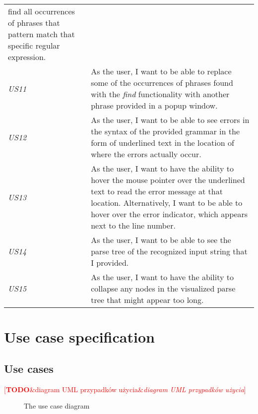 \documentclass[english,engineering]{wizthesis}
\newcommand{\todo}[1]{%
  \textcolor{red}{[\textbf{TODO}\ifx&#1&{}\else{ }\fi\emph{#1}]}%
}
\begin{document}
\begin{xltabular}{\textwidth}{@{}lX@{}}
  find all occurrences of phrases that pattern match that specific regular
  expression.  \\
  \addlinespace[0.5em] \emph{US11} & As the user, I want to be able to replace
  some of the occurrences of phrases found with the \emph{find} functionality
  with another phrase provided in a popup window. \\
  \addlinespace[0.5em] \emph{US12} & As the user, I want to be able to see
  errors in the syntax of the provided grammar in the form of underlined text in
  the location of where the errors actually occur. \\
  \addlinespace[0.5em] \emph{US13} & As the user, I want to have the ability to
  hover the mouse pointer over the underlined text to read the error message at
  that location. Alternatively, I want to be able to hover over the error
  indicator, which appears next to the line number. \\
  \addlinespace[0.5em] \emph{US14} & As the user, I want to be able to see the
  parse tree of the recognized input string that I provided. \\
  \addlinespace[0.5em] \emph{US15} & As the user, I want to have the ability to
  collapse any nodes in the visualized parse tree that might appear too long.
  \\* \bottomrule
\end{xltabular}

\section{Use case specification}

\subsection{Use cases}

\todo{diagram UML przypadków użycia}

\begin{figure}[H]
  \centering

  \caption{The use case diagram}
  \label{fig:use-case-diagram}
\end{figure}
\end{document}
